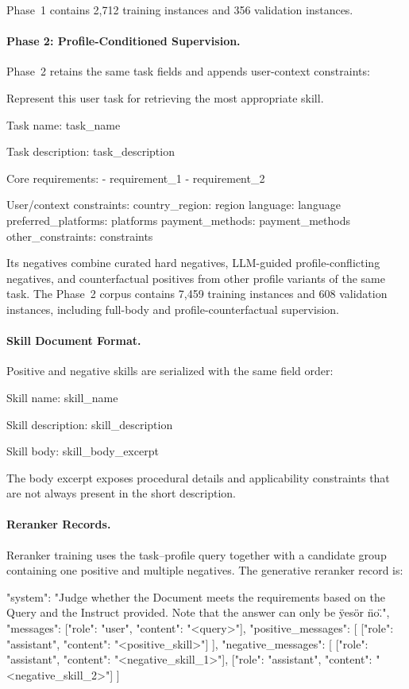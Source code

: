 \documentclass[letterpaper]{article} %
\begin{document}
Phase~1 contains 2,712 training instances and 356 validation instances.

\paragraph{Phase 2: Profile-Conditioned Supervision.}
Phase~2 retains the same task fields and appends user-context constraints:
\begin{appendixcode}
Represent this user task for retrieving the most appropriate skill.

Task name: {task_name}

Task description: {task_description}

Core requirements:
- {requirement_1}
- {requirement_2}

User/context constraints:
country_region: {region}
language: {language}
preferred_platforms: {platforms}
payment_methods: {payment_methods}
other_constraints: {constraints}
\end{appendixcode}

Its negatives combine curated hard negatives, LLM-guided
profile-conflicting negatives, and counterfactual positives from other
profile variants of the same task. The Phase~2 corpus contains 7,459
training instances and 608 validation instances, including full-body and
profile-counterfactual supervision.

\paragraph{Skill Document Format.}
Positive and negative skills are serialized with the same field order:
\begin{appendixcode}
Skill name: {skill_name}

Skill description: {skill_description}

Skill body:
{skill_body_excerpt}
\end{appendixcode}
The body excerpt exposes procedural details and applicability constraints
that are not always present in the short description.

\paragraph{Reranker Records.}
Reranker training uses the task--profile query together with a candidate
group containing one positive and multiple negatives. The generative
reranker record is:
\begin{appendixcode}
{
  "system":
    "Judge whether the Document meets the requirements based
     on the Query and the Instruct provided. Note that the
     answer can only be \"yes\" or \"no\".",
  "messages": [{"role": "user", "content": "<query>"}],
  "positive_messages": [
    [{"role": "assistant", "content": "<positive_skill>"}]
  ],
  "negative_messages": [
    [{"role": "assistant", "content": "<negative_skill_1>"}],
    [{"role": "assistant", "content": "<negative_skill_2>"}]
  ]
}
\end{appendixcode}
\end{document}
